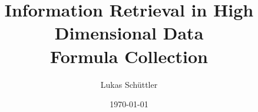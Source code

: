

\title{Information Retrieval in High Dimensional Data \\ Formula Collection}
\author{Lukas Schüttler}
\date{\today}
\pagestyle{empty}

\maketitle
\thispagestyle{empty}
\begin{multicols}{2}
  
  
  \newpage
  
  
\end{multicols}

